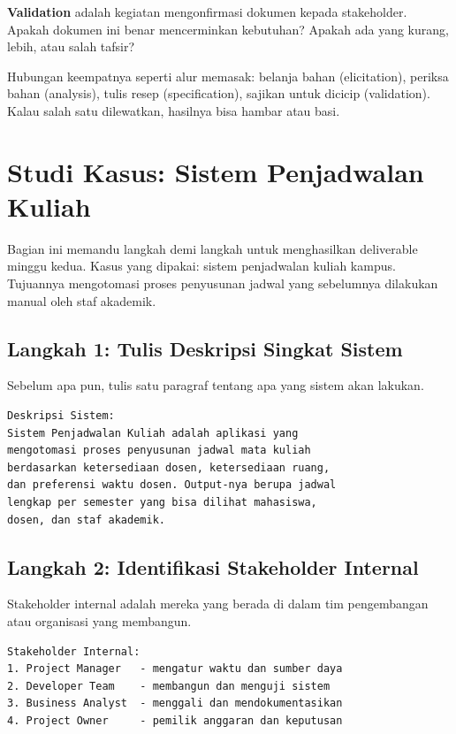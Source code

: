 \documentclass[11pt,a4paper]{article}
\begin{document}
\textbf{Validation} adalah kegiatan mengonfirmasi dokumen kepada stakeholder. Apakah dokumen ini benar mencerminkan kebutuhan? Apakah ada yang kurang, lebih, atau salah tafsir?

Hubungan keempatnya seperti alur memasak: belanja bahan (elicitation), periksa bahan (analysis), tulis resep (specification), sajikan untuk dicicip (validation). Kalau salah satu dilewatkan, hasilnya bisa hambar atau basi.

\section{Studi Kasus: Sistem Penjadwalan Kuliah}

Bagian ini memandu langkah demi langkah untuk menghasilkan deliverable minggu kedua. Kasus yang dipakai: sistem penjadwalan kuliah kampus. Tujuannya mengotomasi proses penyusunan jadwal yang sebelumnya dilakukan manual oleh staf akademik.

\subsection{Langkah 1: Tulis Deskripsi Singkat Sistem}

Sebelum apa pun, tulis satu paragraf tentang apa yang sistem akan lakukan.

\begin{lstlisting}[style=out]
Deskripsi Sistem:
Sistem Penjadwalan Kuliah adalah aplikasi yang
mengotomasi proses penyusunan jadwal mata kuliah
berdasarkan ketersediaan dosen, ketersediaan ruang,
dan preferensi waktu dosen. Output-nya berupa jadwal
lengkap per semester yang bisa dilihat mahasiswa,
dosen, dan staf akademik.
\end{lstlisting}

\subsection{Langkah 2: Identifikasi Stakeholder Internal}

Stakeholder internal adalah mereka yang berada di dalam tim pengembangan atau organisasi yang membangun.

\begin{lstlisting}[style=out]
Stakeholder Internal:
1. Project Manager   - mengatur waktu dan sumber daya
2. Developer Team    - membangun dan menguji sistem
3. Business Analyst  - menggali dan mendokumentasikan
4. Project Owner     - pemilik anggaran dan keputusan
\end{lstlisting}
\end{document}
